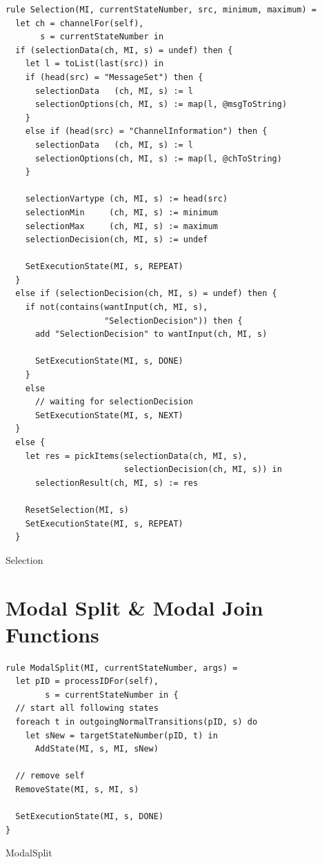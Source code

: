 \begin{listing}[H]
\begin{verbatim}
rule Selection(MI, currentStateNumber, src, minimum, maximum) =
  let ch = channelFor(self),
       s = currentStateNumber in
  if (selectionData(ch, MI, s) = undef) then {
    let l = toList(last(src)) in
    if (head(src) = "MessageSet") then {
      selectionData   (ch, MI, s) := l
      selectionOptions(ch, MI, s) := map(l, @msgToString)
    }
    else if (head(src) = "ChannelInformation") then {
      selectionData   (ch, MI, s) := l
      selectionOptions(ch, MI, s) := map(l, @chToString)
    }

    selectionVartype (ch, MI, s) := head(src)
    selectionMin     (ch, MI, s) := minimum
    selectionMax     (ch, MI, s) := maximum
    selectionDecision(ch, MI, s) := undef

    SetExecutionState(MI, s, REPEAT)
  }
  else if (selectionDecision(ch, MI, s) = undef) then {
    if not(contains(wantInput(ch, MI, s),
                    "SelectionDecision")) then {
      add "SelectionDecision" to wantInput(ch, MI, s)

      SetExecutionState(MI, s, DONE)
    }
    else
      // waiting for selectionDecision
      SetExecutionState(MI, s, NEXT)
  }
  else {
    let res = pickItems(selectionData(ch, MI, s),
                        selectionDecision(ch, MI, s)) in
      selectionResult(ch, MI, s) := res

    ResetSelection(MI, s)
    SetExecutionState(MI, s, REPEAT)
  }
\end{verbatim}
\caption{Selection}
\label{lst:asm:Selection}
\end{listing}


\section{Modal Split \& Modal Join Functions}


\begin{listing}[H]
\begin{verbatim}
rule ModalSplit(MI, currentStateNumber, args) =
  let pID = processIDFor(self),
        s = currentStateNumber in {
  // start all following states
  foreach t in outgoingNormalTransitions(pID, s) do
    let sNew = targetStateNumber(pID, t) in
      AddState(MI, s, MI, sNew)

  // remove self
  RemoveState(MI, s, MI, s)

  SetExecutionState(MI, s, DONE)
}
\end{verbatim}
\caption{ModalSplit}
\label{lst:asm:ModalSplit}
\end{listing}




